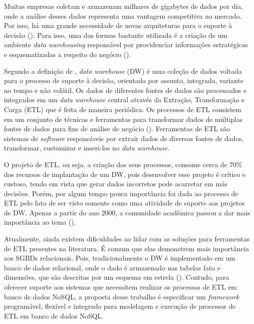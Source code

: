 Muitas empresas coletam e armazenam milhares de gigabytes de dados por dia, onde a análise desses dados representa uma vantagem competitiva no mercado. Por isso, há uma grande necessidade de novas arquiteturas para o suporte à decisão (\cite{liu:2013}). Para isso, uma das formas bastante utilizada é a criação de um ambiente \textit{data warehousing} responsável por providenciar informações estratégicas e esquematizadas a respeito do negócio (\cite{dayal:1997}).

Segundo a definição de \cite{kimball:2002}, \textit{data warehouse} (DW) é uma coleção de dados voltada para o processo de suporte à decisão, orientada por assunto, integrada, variante no tempo e não volátil. Os dados de diferentes fontes de dados são processados e integrados em um \textit{data warehouse} central através da Extração, Transformação e Carga (ETL) que é feita de maneira periódica. Os processos de ETL consistem em um conjunto de técnicas e ferramentas para transformar dados de múltiplas fontes de dados para fins de análise de negócio (\cite{silva:2016}). Ferramentas de ETL são sistemas de \textit{software} responsáveis por extrair dados de diversas fontes de dados, transformar, customizar e inseri-los no \textit{data warehouse}.

O projeto de ETL, ou seja, a criação dos seus processos, consome cerca de 70\% dos recursos de implantação de um DW, pois desenvolver esse projeto é crítico e custoso, tendo em vista que gerar dados incorretos pode acarretar em más decisões. Porém, por algum tempo pouca importância foi dada ao processo de ETL pelo fato de ser visto somente como uma atividade de suporte aos projetos de DW. Apenas a partir do ano 2000, a comunidade acadêmica passou a dar mais importância ao tema (\cite{silva:2012}). 

Atualmente, ainda existem dificuldades ao lidar com as soluções para ferramentas de ETL presentes na literatura. É comum que elas  demonstrem mais importância aos SGBDs relacionais. Pois, tradicionalmente o DW é implementado em um banco de dados relacional, onde o dado é armazenado nas tabelas fato e dimensões, que são descritas por um esquema em estrela (\cite{kimball:2002}). Contudo, para oferecer suporte aos sistemas que necessitem realizar os processos de ETL em banco de dados NoSQL, a proposta desse trabalho é especificar um \textit{framework} programável, flexível e integrado para modelagem e execução de processos de ETL em banco de dados NoSQL.

%

